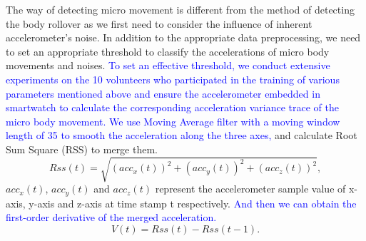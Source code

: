 The way of detecting micro movement is different from the method of detecting the body rollover as we first need to consider the influence of inherent accelerometer's noise. In addition to the appropriate data preprocessing, we need to set an appropriate threshold to classify the accelerations of micro body movements and noises. \textcolor{blue}{To set an effective threshold, we conduct extensive experiments on the 10 volunteers who participated in the training of various parameters mentioned above and ensure the accelerometer embedded in smartwatch to calculate the corresponding acceleration variance trace of the micro body movement. We use Moving Average filter with a moving window length of 35 to smooth the acceleration along the three axes,} and calculate Root Sum Square (RSS) to merge them.
\begin{equation}
      Rss(t) =\sqrt{(acc_x(t))^{2}+(acc_y(t))^{2}+(acc_z(t))^{2}},
\end{equation}
$acc_x(t)$, $acc_y(t)$ and $acc_z(t)$ represent the accelerometer sample value of x-axis, y-axis and z-axis at time stamp t respectively. \textcolor{blue}{And then we can obtain the first-order derivative of the merged acceleration.}
\begin{equation}
      V(t)=Rss(t)-Rss(t-1).
\end{equation}


